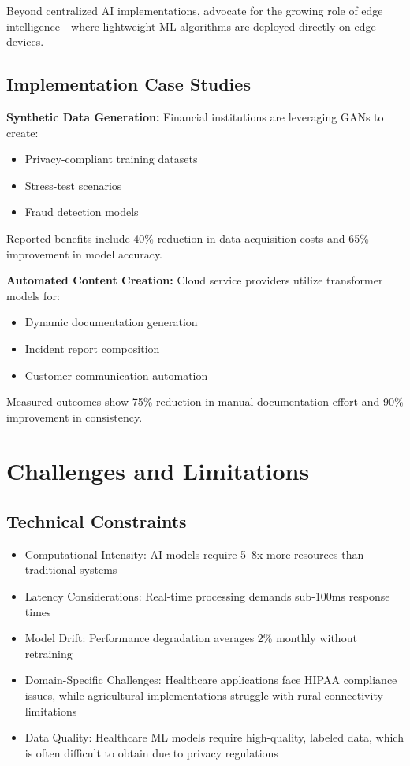 \documentclass[a4paper,12pt]{article}
\begin{document}
Beyond centralized AI implementations, \citet{hoffpauir2023survey} advocate for the growing role of edge intelligence—where lightweight ML algorithms are deployed directly on edge devices.

\subsection{Implementation Case Studies}
\textbf{Synthetic Data Generation:} Financial institutions are leveraging GANs to create:
\begin{itemize}
    \item Privacy-compliant training datasets
    \item Stress-test scenarios
    \item Fraud detection models
\end{itemize}
Reported benefits include 40\% reduction in data acquisition costs and 65\% improvement in model accuracy.

\textbf{Automated Content Creation:} Cloud service providers utilize transformer models for:
\begin{itemize}
    \item Dynamic documentation generation
    \item Incident report composition
    \item Customer communication automation
\end{itemize}
Measured outcomes show 75\% reduction in manual documentation effort and 90\% improvement in consistency.

\section{Challenges and Limitations}
\subsection{Technical Constraints}
\begin{itemize}
    \item Computational Intensity: AI models require 5--8x more resources than traditional systems
    \item Latency Considerations: Real-time processing demands sub-100ms response times
    \item Model Drift: Performance degradation averages 2\% monthly without retraining
    \item Domain-Specific Challenges: Healthcare applications face HIPAA compliance issues, while agricultural implementations struggle with rural connectivity limitations
    \item Data Quality: Healthcare ML models require high-quality, labeled data, which is often difficult to obtain due to privacy regulations
\end{itemize}
\end{document}
